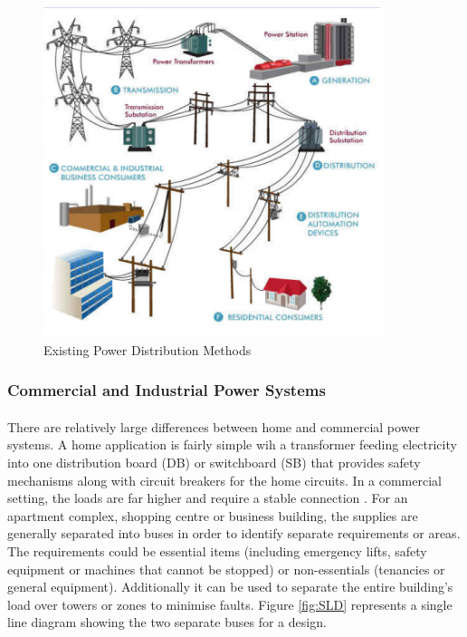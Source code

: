 \begin{figure}[H]
\hfill\includegraphics[width = 100mm]{images/Power_Distro}\hspace*{\fill}
\caption{Existing Power Distribution Methods \cite{Active2015}}
\label{fig:ExistingPower}
\end{figure}

\subsubsection{Commercial and Industrial Power Systems}

\paragraph{}
There are relatively large differences between home and commercial power systems. A home application is fairly simple wih a transformer feeding electricity into one distribution board (DB) or switchboard (SB) that provides safety mechanisms along with circuit breakers for the home circuits. In a commercial setting, the loads are far higher and require a stable connection \cite{Baran2003}. For an apartment complex, shopping centre or business building, the supplies are generally separated into buses in order to identify separate requirements or areas. The requirements could be essential items (including emergency lifts, safety equipment or machines that cannot be stopped) or non-essentials (tenancies or general equipment). Additionally it can be used to separate the entire building's load over towers or zones to minimise faults. Figure \ref{fig:SLD} represents a single line diagram showing the two separate buses for a design. 

